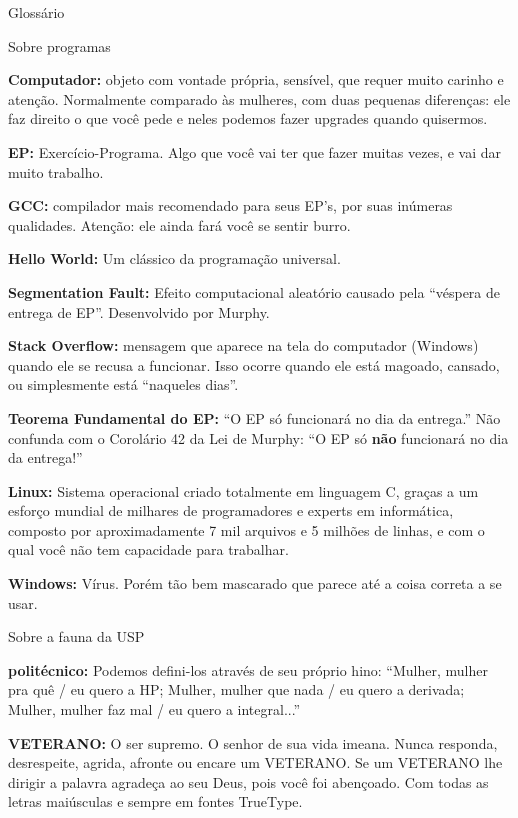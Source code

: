 \begin{secao}{Glossário}
\begin{subsecao}{Sobre programas}

{\bf Computador:} objeto com vontade própria, sensível, que requer muito carinho e atenção. Normalmente comparado às mulheres, com duas pequenas diferenças: ele faz direito o que você pede e neles podemos fazer upgrades quando quisermos.

{\bf EP:} Exercício-Programa. Algo que você vai ter que fazer muitas vezes, e vai dar
muito trabalho.

{\bf GCC:} compilador mais recomendado para seus EP's, por suas inúmeras
qualidades. Atenção: ele ainda fará você se sentir burro.

{\bf Hello World:} Um clássico da programação universal.

{\bf Segmentation Fault:} Efeito computacional aleatório causado pela ``véspera de
entrega de EP''. Desenvolvido por Murphy.

{\bf Stack Overflow:} mensagem que aparece na tela do computador (Windows)
quando ele se recusa a funcionar. Isso ocorre quando ele está magoado, cansado, ou
simplesmente está ``naqueles dias''.

{\bf Teorema Fundamental do EP:} ``O EP só funcionará no dia da entrega.'' Não
confunda com o Corolário 42 da Lei de Murphy: ``O EP só {\bf não}
funcionará no dia da entrega!''

{\bf Linux:} Sistema operacional criado totalmente em linguagem C, graças a um
esforço mundial de milhares de programadores e experts em informática, composto
por aproximadamente 7 mil arquivos e 5 milhões de linhas, e com o qual você não
tem capacidade para trabalhar.

{\bf Windows:} Vírus. Porém tão bem mascarado que parece até a coisa correta a se usar.
\end{subsecao}

\begin{subsecao}{Sobre a fauna da USP}

{\bf politécnico:} Podemos
defini-los através de seu próprio hino: ``Mulher, mulher
pra quê / eu quero a HP; Mulher, mulher que nada / eu quero a derivada; Mulher,
mulher faz mal / eu quero a integral...''

{\bf VETERANO:} O ser supremo. O senhor de sua vida imeana. Nunca responda,
desrespeite, agrida, afronte ou encare um VETERANO. Se um VETERANO lhe dirigir
a palavra agradeça ao seu Deus, pois você foi abençoado. Com todas as letras
maiúsculas e sempre em fontes TrueType.


\end{subsecao}
\end{secao}
